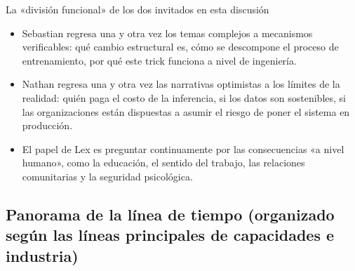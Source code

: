 \begin{knowledgebox}{La «división funcional» de los dos invitados en esta discusión}
\begin{itemize}[leftmargin=1.5em]
    \item Sebastian regresa una y otra vez los temas complejos a mecanismos verificables: qué cambio estructural es, cómo se descompone el proceso de entrenamiento, por qué este trick funciona a nivel de ingeniería.
    \item Nathan regresa una y otra vez las narrativas optimistas a los límites de la realidad: quién paga el costo de la inferencia, si los datos son sostenibles, si las organizaciones están dispuestas a asumir el riesgo de poner el sistema en producción.
    \item El papel de Lex es preguntar continuamente por las consecuencias «a nivel humano», como la educación, el sentido del trabajo, las relaciones comunitarias y la seguridad psicológica.
\end{itemize}
\end{knowledgebox}

\subsection{Panorama de la línea de tiempo (organizado según las líneas principales de capacidades e industria)}

